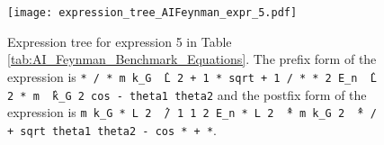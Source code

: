 \documentclass[12pt]{iopart}
\begin{document}
\begin{figure}
    \centering
    \texttt{[image: expression\_tree\_AIFeynman\_expr\_5.pdf]}
    \caption{Expression tree for expression 5 in Table \ref{tab:AI_Feynman_Benchmark_Equations}. The prefix form of the expression is \texttt{* / * m k\_G \^\ L 2 + 1 * sqrt + 1 / * * 2 E\_n \^\ L 2 * m \^\ k\_G 2 cos - theta1 theta2} and the postfix form of the expression is \texttt{m k\_G * L 2 \^\ / 1 1 2 E\_n * L 2 \^\ * m k\_G 2 \^\ * / + sqrt theta1 theta2 - cos * +  *}. } 
    \label{fig:expression_tree_AIFeynman_expr_5}
\end{figure}
\end{document}
